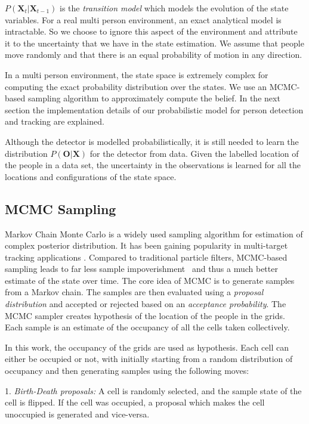 $P(\textbf{X}_{t}|\textbf{X}_{t-1})$ is the \textit{transition model} which models the evolution of the state variables. For a real multi person environment, an exact analytical model is intractable. So we choose to ignore this aspect of the environment and attribute it to the uncertainty that we have in the state estimation. We assume that people move randomly and that there is an equal probability of motion in any direction. 

In a multi person environment, the state space is extremely complex for computing the exact probability 
distribution over the states. We use an MCMC-based sampling algorithm to approximately compute the belief. In the next section the implementation details of our probabilistic model for person detection and tracking are explained.


Although the detector is modelled probabilistically, it is still needed to learn the distribution $P(\textbf{O}|\textbf{X})$ for the detector from data. Given the labelled location of the people in a data set, the uncertainty in the observations is learned for all the locations and configurations of the state space.



\subsection{MCMC Sampling}
\label{MCMC}
Markov Chain Monte Carlo is a widely used sampling algorithm for estimation of complex posterior distribution. It has been gaining popularity in multi-target tracking applications \cite{khan2004mcmc}. Compared to traditional particle filters, MCMC-based sampling leads to far less sample impoverishment%
~and thus a much better estimate of the state over time. The core idea of MCMC is to generate samples from a Markov chain. The samples are then evaluated using a \textit{proposal distribution} and accepted or rejected based on an \textit{acceptance probability}. The MCMC sampler creates hypothesis of the location of the people in the grids. Each sample is an estimate of the occupancy of all the cells taken collectively. 

In this work, the occupancy of the grids are used as hypothesis. Each cell can either be occupied or not, with initially starting from a random distribution of occupancy and then generating samples using the following moves:

1. \textit{Birth-Death proposals:}
A cell is randomly selected, and the sample state of the cell is flipped. If the cell was occupied, a proposal which makes the cell unoccupied is generated and vice-versa.

